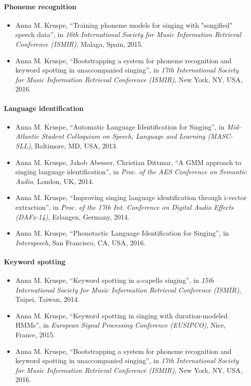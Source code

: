 \paragraph{Phoneme recognition}
\begin{itemize}
\item Anna M. Kruspe, ``Training phoneme models for singing with "songified" speech data'', in \textit{16th International Society for Music Information Retrieval Conference (ISMIR)}, Malaga, Spain, 2015.
\item Anna M. Kruspe, ``Bootstrapping a system for phoneme recognition and keyword spotting in unaccompanied singing'', in \textit{17th International Society for Music Information Retrieval Conference (ISMIR)}, New York, NY, USA, 2016.
\end{itemize}

\paragraph{Language identification}
\begin{itemize}
\item Anna M. Kruspe, ``Automatic Language Identification for Singing'', in \textit{Mid-Atlantic Student Colloquium on Speech, Language and Learning (MASC-SLL)}, Baltimore, MD, USA, 2013.
\item Anna M. Kruspe, Jakob Abesser, Christian Dittmar, ``A GMM approach to singing language identification'', in \textit{Proc. of the AES Conference on Semantic Audio}, London, UK, 2014.
\item Anna M. Kruspe, ``Improving singing language identification through i-vector extraction'', in \textit{Proc. of the 17th Int. Conference on Digital Audio Effects (DAFx-14)}, Erlangen, Germany, 2014.
\item Anna M. Kruspe, ``Phonotactic Language Identification for Singing'', in \textit{Interspeech}, San Francisco, CA, USA, 2016.
\end{itemize}

\paragraph{Keyword spotting}
\begin{itemize}
\item Anna M. Kruspe, ``Keyword spotting in a-capella singing'', in \textit{15th International Society for Music Information Retrieval Conference (ISMIR)}, Taipei, Taiwan, 2014.
\item Anna M. Kruspe, ``Keyword spotting in singing with duration-modeled HMMs'', in \textit{European Signal Processing Conference (EUSIPCO)}, Nice, France, 2015.
\item Anna M. Kruspe, ``Bootstrapping a system for phoneme recognition and keyword spotting in unaccompanied singing'', in \textit{17th International Society for Music Information Retrieval Conference (ISMIR)}, New York, NY, USA, 2016.
\end{itemize}

